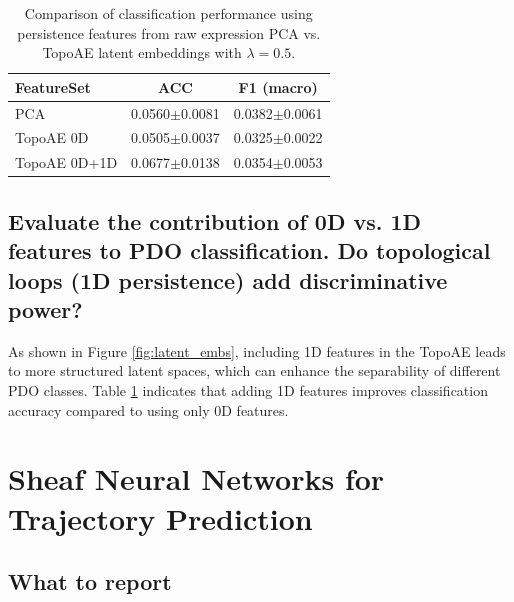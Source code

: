 \documentclass[11pt]{article}
\begin{document}
\begin{table}[h!]
    \centering
    \begin{tabular}{lcc}
    \toprule
    \textbf{FeatureSet} & \textbf{ACC} & \textbf{F1 (macro)} \\
    \midrule
    PCA & 0.0560$\pm$0.0081 & 0.0382$\pm$0.0061 \\
    TopoAE 0D & 0.0505$\pm$0.0037 & 0.0325$\pm$0.0022 \\
    TopoAE 0D+1D & 0.0677$\pm$0.0138 & 0.0354$\pm$0.0053 \\
    \bottomrule
    \end{tabular}
    \caption{Comparison of classification performance using persistence features from raw expression PCA vs. TopoAE latent embeddings with $\lambda = 0.5$.}
    \label{tab:comparison}
\end{table}

\subsection{Evaluate the contribution of 0D vs. 1D features to PDO classification. Do topological loops
(1D persistence) add discriminative power?}

As shown in Figure \ref{fig:latent_embs}, including 1D features in the TopoAE leads to more structured latent spaces, 
which can enhance the separability of different PDO classes. 
Table \ref{tab:comparison} indicates that adding 1D features improves classification accuracy compared to using only 0D features.


\pagebreak

\section{Sheaf Neural Networks for Trajectory Prediction}

\subsection*{What to report}
\end{document}
